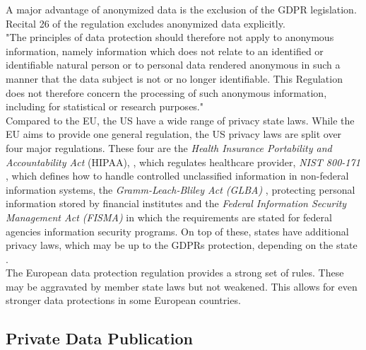         A major advantage of anonymized data is the exclusion of the GDPR legislation. Recital 26 of the regulation excludes anonymized data explicitly.\\ 
        "The principles of data protection should therefore not apply to anonymous information, namely information which does not relate to an identified or identifiable natural person or to personal data rendered anonymous in such a manner that the data subject is not or no longer identifiable. This Regulation does not therefore concern the processing of such anonymous information, including for statistical or research purposes." \cite{european_union_regulation_2016}\\
        Compared to the EU, the US have a wide range of privacy state laws. While the EU aims to provide one general regulation, the US privacy laws are split over four major regulations.
        These four are the \textit{Health Insurance Portability and Accountability Act} (HIPAA), \cite{rights_ocr_summary_2009}, which regulates healthcare provider, \textit{NIST 800-171} \cite{ross_protecting_2015}, which defines how to handle controlled unclassified information in non-federal information systems, the \textit{Gramm-Leach-Bliley Act (GLBA)} \cite{noauthor_gramm-leach-bliley_2013}, protecting personal information stored by financial institutes and the \textit{Federal Information Security Management Act (FISMA)} \cite{carper_s2521_2014} in which the requirements are stated for federal agencies information security programs. On top of these, states have additional privacy laws, which may be up to the GDPRs protection, depending on the state \cite{andrada_coos_eu_nodate}.\\
        The European data protection regulation provides a strong set of rules. These may be aggravated by member state laws but not weakened. This allows for even stronger data protections in some European countries.
        
    \subsection{Private Data Publication}
        \label{subsec:related:private_data_analysis}
    
